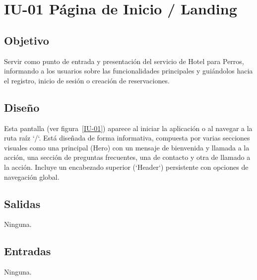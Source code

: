\section{IU-01 Página de Inicio / Landing}

\subsection{Objetivo}
    Servir como punto de entrada y presentación del servicio de Hotel para Perros, informando a los usuarios sobre las funcionalidades principales y guiándolos hacia el registro, inicio de sesión o creación de reservaciones.

\subsection{Diseño}
    Esta pantalla  (ver figura~\ref{IU-01}) aparece al iniciar la aplicación o al navegar a la ruta raíz `/`. Está diseñada de forma informativa, compuesta por varias secciones visuales como una principal (Hero) con un mensaje de bienvenida y llamada a la acción, una sección de preguntas frecuentes, una de contacto y otra de llamado a la acción. Incluye un encabezado superior (`Header`) persistente con opciones de navegación global.


\subsection{Salidas}
    Ninguna.

\subsection{Entradas}
    Ninguna.

